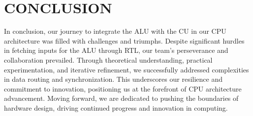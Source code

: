 \documentclass[pdftex,12pt,a4paper]{article}
\begin{document}
	
	
	
	\section{CONCLUSION}
	
	In conclusion, our journey to integrate the ALU with the CU in our CPU architecture was filled with challenges and triumphs. Despite significant hurdles in fetching inputs for the ALU through RTL, our team's perseverance and collaboration prevailed. Through theoretical understanding, practical experimentation, and iterative refinement, we successfully addressed complexities in data routing and synchronization. This underscores our resilience and commitment to innovation, positioning us at the forefront of CPU architecture advancement. Moving forward, we are dedicated to pushing the boundaries of hardware design, driving continued progress and innovation in computing.
	
	
	\newpage
	
	
	
	
\end{document}

